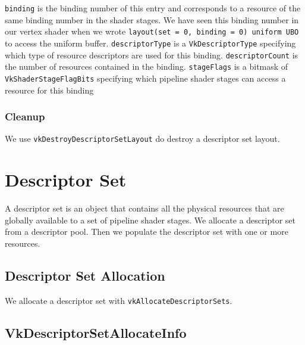 \begin{minipage}{\linewidth}{\noindent}
    
\end{minipage}

\texttt{binding} is the binding number of this entry and corresponds to
a resource of the same binding number in the shader stages.
We have seen this binding number in our vertex shader when we wrote
\texttt{layout(set = 0, binding = 0) uniform UBO} to access the uniform buffer.
\texttt{descriptorType} is a \texttt{VkDescriptorType} specifying which type of
resource descriptors are used for this binding.
\texttt{descriptorCount} is the number of resources contained in the binding.
\texttt{stageFlags} is a bitmask of \texttt{VkShaderStageFlagBits} specifying which
pipeline shader stages can access a resource for this binding
\subsubsection{Cleanup}

We use \texttt{vkDestroyDescriptorSetLayout} do destroy a descriptor
set layout.

\section{Descriptor Set}

A descriptor set is an object that contains all the physical resources that
are globally available to a set of pipeline shader stages.
We allocate a descriptor set from a descriptor pool.
Then we populate the descriptor set with one or more resources.

\subsection{Descriptor Set Allocation}

We allocate a descriptor set with \texttt{vkAllocateDescriptorSets}.

\begin{minipage}{\linewidth}{\noindent}
    
\end{minipage}

\subsection{VkDescriptorSetAllocateInfo}

